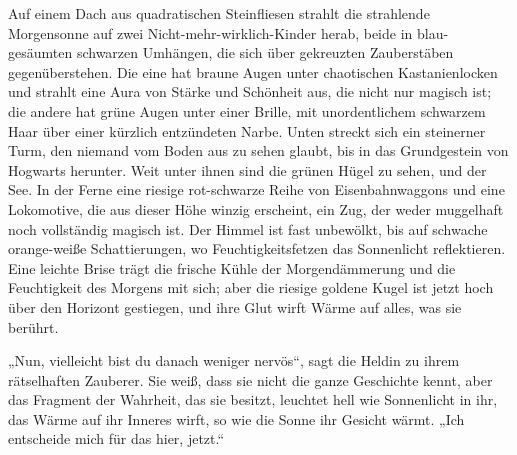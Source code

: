 \later

Auf einem Dach aus quadratischen Steinfliesen strahlt die strahlende Morgensonne auf zwei Nicht-mehr-wirklich-Kinder herab, beide in blau-gesäumten schwarzen Umhängen, die sich über gekreuzten Zauberstäben gegenüberstehen.
Die eine hat braune Augen unter chaotischen Kastanienlocken und strahlt eine Aura von Stärke und Schönheit aus, die nicht nur magisch ist; die andere hat grüne Augen unter einer Brille, mit unordentlichem schwarzem Haar über einer kürzlich entzündeten Narbe. Unten streckt sich ein steinerner Turm, den niemand vom Boden aus zu sehen glaubt, bis in das Grundgestein von Hogwarts herunter. Weit unter ihnen sind die grünen Hügel zu sehen, und der See. In der Ferne eine riesige rot-schwarze Reihe von Eisenbahnwaggons und eine Lokomotive, die aus dieser Höhe winzig erscheint, ein Zug, der weder muggelhaft noch vollständig magisch ist. Der Himmel ist fast unbewölkt, bis auf schwache orange-weiße Schattierungen, wo Feuchtigkeitsfetzen das Sonnenlicht reflektieren. Eine leichte Brise trägt die frische Kühle der Morgendämmerung und die Feuchtigkeit des Morgens mit sich; aber die riesige goldene Kugel ist jetzt hoch über den Horizont gestiegen, und ihre Glut wirft Wärme auf alles, was sie berührt.

„Nun, vielleicht bist du danach weniger nervös“, sagt die Heldin zu ihrem rätselhaften Zauberer. Sie weiß, dass sie nicht die ganze Geschichte kennt, aber das Fragment der Wahrheit, das sie besitzt, leuchtet hell wie Sonnenlicht in ihr, das Wärme auf ihr Inneres wirft, so wie die Sonne ihr Gesicht wärmt.
„Ich entscheide mich für das hier, jetzt.“

